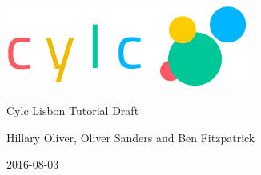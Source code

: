 \thispagestyle{empty}

\begin{titlepage}
    \begin{center}
        \includegraphics[width=0.6\textwidth]{resources/tex/cylc-logo}

        \Huge{Cylc Lisbon Tutorial Draft}

        \large{Hillary Oliver, Oliver Sanders and Ben Fitzpatrick}

        \small{2016-08-03}
    \end{center}

\tableofcontents
\end{titlepage}
